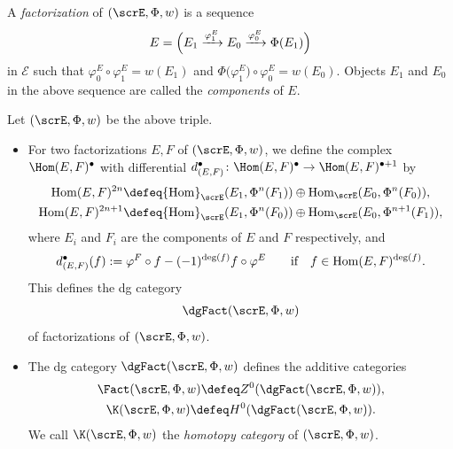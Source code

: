 \begin{dfn} A {\it factorization} of $(\scrE,\Phi,w)$ is a sequence
\begin{gather*}
E=\Bigl(E_1\xrightarrow{\varphi^E_1}E_0\xrightarrow{\varphi^E_0}\Phi(E_1)\Bigr)
\end{gather*}
in $\mathcal{E}$ such that $\varphi^E_0\circ\varphi^E_1=w(E_1)$ and $\Phi\big(\varphi^E_1\big)\circ\varphi^E_0=w(E_0)$. Objects $E_1$ and $E_0$ in the above sequence are called the {\it components} of $E$. \end{dfn}


\begin{dfn}
Let $(\scrE,\Phi,w)$ be the above triple.
\begin{itemize}\itemsep=0pt
\item[$1.$] For two factorizations $E,F$ of $(\scrE,\Phi,w)$, we define the complex $\Hom(E,F)^{\bullet}$ with differential $d^{\bullet}_{(E,F)}\colon\Hom(E,F)^{\bullet}\to\Hom(E,F)^{\bullet+1}$ by
\begin{gather*}
{\rm Hom}(E,F)^{2n}\defeq{\rm Hom}_{\scrE}(E_1,\Phi^n(F_1))\oplus{\rm Hom}_{\scrE}(E_0,\Phi^n(F_0)),
\\
{\rm Hom}(E,F)^{2n+1}\defeq{\rm Hom}_{\scrE}(E_1,\Phi^{n}(F_0))\oplus{\rm Hom}_{\scrE}(E_0,\Phi^{n+1}(F_1)),
\end{gather*}
where $E_i$ and $F_i$ are the components of $E$ and $F$ respectively, and
\begin{gather*}
d^{\bullet}_{(E,F)}(f):=\varphi^F\circ f-(-1)^{{\rm deg}(f)}f\circ \varphi^E
\qquad\text{if}\quad f\in{\rm Hom}(E,F)^{{\rm deg}(f)}.
\end{gather*}
This defines the dg category
\begin{gather*}
\dgFact(\scrE,\Phi,w)
\end{gather*}
of factorizations of $(\scrE,\Phi,w)$.

\item[$2.$] The dg category $\dgFact(\scrE,\Phi,w)$ defines the additive categories
\begin{gather*}
\Fact(\scrE,\Phi,w)\defeq Z^0(\dgFact(\scrE,\Phi,w)),
\\
\K(\scrE,\Phi,w)\defeq H^0(\dgFact(\scrE,\Phi,w)).
\end{gather*}
We call $\K(\scrE,\Phi,w)$ the {\it homotopy category} of $(\scrE,\Phi,w)$.
\end{itemize}
\end{dfn}

